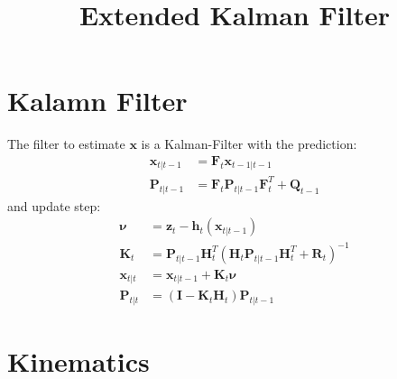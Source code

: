 \documentclass[10pt,a4paper]{article}
\newcommand{\M}[1]{\mathbf{#1}}
\newcommand{\V}[1]{\mathbf{#1}}
\begin{document}
\title{Extended Kalman Filter}

\maketitle

\section{Kalamn Filter}
The filter to estimate $\V x$ is a Kalman-Filter with the prediction:
\begin{align}
    \V x_{t|t-1} &= \M F_t \V x_{t-1|t-1} \\ 
    \M P_{t|t-1} &= \M F_t \M P_{t|t-1} \M F_t^T + \M Q_{t-1}
\end{align}
and update step:
\begin{align}
    \boldsymbol \nu &=  \V z_t - \M h_t( \V x_{t|t-1} )\\
    \V K_t &= \M P_{t|t-1} \M H_t^T \left( \M H_t \M P_{t|t-1} \M H_t^T + \M R_t \right)^{-1} \\
    \V x_{t|t} &= \V x_{t|t-1} + \V K_t \boldsymbol \nu \\
    \M P_{t|t} &= \left( \M I - \V K_t \M H_t \right) \M P_{t|t-1}
\end{align}


\section{Kinematics}
\end{document}
